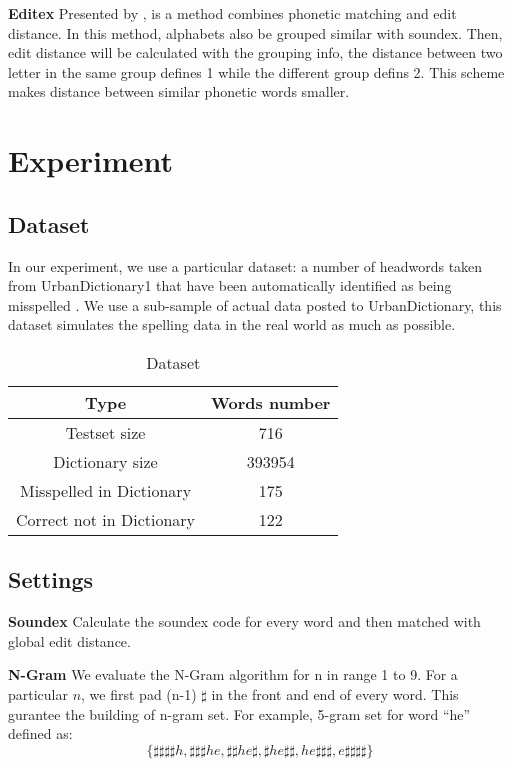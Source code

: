 \documentclass[11pt]{article}
\begin{document}
\noindent\textbf{Editex} Presented by \cite{Zobel1996PhoneticSM}, is a method combines phonetic matching and edit distance. In this method, alphabets also be grouped similar with soundex. Then, edit distance will be  calculated with the grouping info, the distance between two letter in the same group defines 1 while the different group defins 2. This scheme makes distance between similar phonetic words smaller.


\section{Experiment}

\subsection{Dataset} 

In our experiment, we use a particular dataset: a number of headwords taken from UrbanDictionary1 that have been automatically identified as being misspelled \cite{Saphra2016EvaluatingIW}. We use a  sub-sample of actual data posted to UrbanDictionary, this dataset simulates the spelling data in the real world as much as possible.

\begin{table}
	\centering
	\begin{tabular}{c|c}
		\hline
		\textbf{Type} & \textbf{Words number} \\
		\hline
		Testset size & 716 \\
		\hline
		Dictionary  size & 393954 \\
		\hline
		Misspelled in Dictionary & 175 \\
		\hline
		Correct not in Dictionary & 122 \\
		\hline
	\end{tabular}
	\caption{Dataset}
	\label{tab:dataset}
\end{table}

\subsection{Settings} 

\noindent\textbf{Soundex} Calculate the soundex code for every word and then matched with global edit distance.

\noindent\textbf{N-Gram} We evaluate the N-Gram algorithm for n in range 1 to 9. For a particular $n$, we first pad (n-1) $\sharp$ in the front and end of every word. This gurantee the building of n-gram set. For example, 5-gram set for word ``he'' defined as: 
\begin{equation}
\{\sharp\sharp\sharp\sharp h, \sharp\sharp\sharp he, \sharp\sharp he\sharp, \sharp he\sharp\sharp, he\sharp\sharp\sharp, e\sharp\sharp\sharp\sharp\}
\end{equation}
\end{document}
